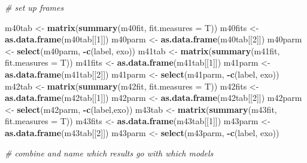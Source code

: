 \documentclass[
]{article}
\newenvironment{Shaded}{\begin{snugshade}}{\end{snugshade}}
\newcommand{\CommentTok}[1]{\textcolor[rgb]{0.56,0.35,0.01}{\textit{#1}}}
\newcommand{\DataTypeTok}[1]{\textcolor[rgb]{0.13,0.29,0.53}{#1}}
\newcommand{\DecValTok}[1]{\textcolor[rgb]{0.00,0.00,0.81}{#1}}
\newcommand{\KeywordTok}[1]{\textcolor[rgb]{0.13,0.29,0.53}{\textbf{#1}}}
\newcommand{\NormalTok}[1]{#1}
\newcommand{\OperatorTok}[1]{\textcolor[rgb]{0.81,0.36,0.00}{\textbf{#1}}}
\newcommand{\StringTok}[1]{\textcolor[rgb]{0.31,0.60,0.02}{#1}}
\begin{document}
\begin{Shaded}
\begin{Highlighting}[]
\CommentTok{# set up frames}

\NormalTok{m40tab <-}\StringTok{ }\KeywordTok{matrix}\NormalTok{(}\KeywordTok{summary}\NormalTok{(m40fit, }\DataTypeTok{fit.measures =}\NormalTok{ T))}
\NormalTok{m40fits <-}\StringTok{ }\KeywordTok{as.data.frame}\NormalTok{(m40tab[[}\DecValTok{1}\NormalTok{]])}
\NormalTok{m40parm <-}\StringTok{ }\KeywordTok{as.data.frame}\NormalTok{(m40tab[[}\DecValTok{2}\NormalTok{]])}
\NormalTok{m40parm <-}\StringTok{ }\KeywordTok{select}\NormalTok{(m40parm, }\OperatorTok{-}\KeywordTok{c}\NormalTok{(label, exo))}
\NormalTok{m41tab <-}\StringTok{ }\KeywordTok{matrix}\NormalTok{(}\KeywordTok{summary}\NormalTok{(m41fit, }\DataTypeTok{fit.measures =}\NormalTok{ T))}
\NormalTok{m41fits <-}\StringTok{ }\KeywordTok{as.data.frame}\NormalTok{(m41tab[[}\DecValTok{1}\NormalTok{]])}
\NormalTok{m41parm <-}\StringTok{ }\KeywordTok{as.data.frame}\NormalTok{(m41tab[[}\DecValTok{2}\NormalTok{]])}
\NormalTok{m41parm <-}\StringTok{ }\KeywordTok{select}\NormalTok{(m41parm, }\OperatorTok{-}\KeywordTok{c}\NormalTok{(label, exo))}
\NormalTok{m42tab <-}\StringTok{ }\KeywordTok{matrix}\NormalTok{(}\KeywordTok{summary}\NormalTok{(m42fit, }\DataTypeTok{fit.measures =}\NormalTok{ T))}
\NormalTok{m42fits <-}\StringTok{ }\KeywordTok{as.data.frame}\NormalTok{(m42tab[[}\DecValTok{1}\NormalTok{]])}
\NormalTok{m42parm <-}\StringTok{ }\KeywordTok{as.data.frame}\NormalTok{(m42tab[[}\DecValTok{2}\NormalTok{]])}
\NormalTok{m42parm <-}\StringTok{ }\KeywordTok{select}\NormalTok{(m42parm, }\OperatorTok{-}\KeywordTok{c}\NormalTok{(label,exo))}
\NormalTok{m43tab <-}\StringTok{ }\KeywordTok{matrix}\NormalTok{(}\KeywordTok{summary}\NormalTok{(m43fit, }\DataTypeTok{fit.measures =}\NormalTok{ T))}
\NormalTok{m43fits <-}\StringTok{ }\KeywordTok{as.data.frame}\NormalTok{(m43tab[[}\DecValTok{1}\NormalTok{]])}
\NormalTok{m43parm <-}\StringTok{ }\KeywordTok{as.data.frame}\NormalTok{(m43tab[[}\DecValTok{2}\NormalTok{]])}
\NormalTok{m43parm <-}\StringTok{ }\KeywordTok{select}\NormalTok{(m43parm, }\OperatorTok{-}\KeywordTok{c}\NormalTok{(label, exo))}

\CommentTok{# combine and name which results go with which models}


\end{Highlighting}
\end{Shaded}
\end{document}
